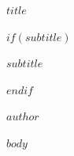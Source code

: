 \documentclass[11pt,openany]{book}
\begin{document}
\thispagestyle{empty}
\vspace*{0.26\textheight}
\begin{center}
{\fontsize{24}{28}\selectfont\bfseries $title$\par}
$if(subtitle)$
\vspace{0.6em}
{\large $subtitle$\par}
$endif$
\vfill
{\large $author$\par}
\end{center}
\clearpage

\frontmatter
\tableofcontents
\clearpage
\mainmatter
\setcounter{page}{1}

$body$
\end{document}

